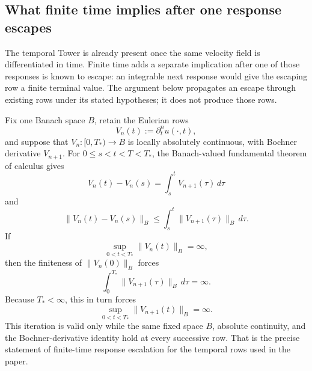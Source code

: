 
\subsection{What finite time implies after one response escapes}\label{sub:FiniteTimeResponseEscalation}

The temporal Tower is already present once the same velocity field is differentiated in time.
Finite time adds a separate implication after one of those responses is known to escape: an integrable next response would give the escaping row a finite terminal value.
The argument below propagates an escape through existing rows under its stated hypotheses; it does not produce those rows.

Fix one Banach space \(B\), retain the Eulerian rows
\[
  V_n(t):=\partial_t^n u(\cdot,t),
\]
and suppose that \(V_n:[0,T_*)\to B\) is locally absolutely continuous, with Bochner derivative \(V_{n+1}\).
For \(0\le s<t<T<T_*\), the Banach-valued fundamental theorem of calculus gives
\[
  V_n(t)-V_n(s)
  =
  \int_s^t V_{n+1}(\tau)\,d\tau
\]
and
\[
  \lVert V_n(t)-V_n(s)\rVert_B
  \le
  \int_s^t \lVert V_{n+1}(\tau)\rVert_B\,d\tau.
\]
If
\[
  \sup_{0<t<T_*}\lVert V_n(t)\rVert_B
  =
  \infty,
\]
then the finiteness of \(\lVert V_n(0)\rVert_B\) forces
\[
  \int_0^{T_*}\lVert V_{n+1}(\tau)\rVert_B\,d\tau
  =
  \infty.
\]
Because \(T_*<\infty\), this in turn forces
\[
  \sup_{0<t<T_*}\lVert V_{n+1}(t)\rVert_B
  =
  \infty.
\]
This iteration is valid only while the same fixed space \(B\), absolute continuity, and the Bochner-derivative identity hold at every successive row.
That is the precise statement of finite-time response escalation for the temporal rows used in the paper.
